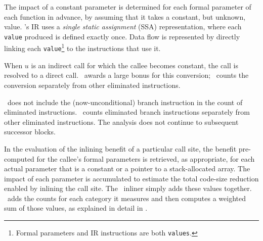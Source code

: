 The impact of a constant parameter is determined for each formal
parameter of each function in advance, by assuming that it takes a
constant, but unknown, value.  \llvm's IR uses a {\it single static
  assignment} (SSA) representation, where each {\tt value} produced is
defined exactly once.  Data flow is represented by directly linking
each {\tt value}\footnote{Formal parameters and IR instructions are
  both {\tt values}.}  to the instructions that use it.  

When $u$ is an indirect call for which the callee becomes constant,
the call is resolved to a direct call.  \llvm\ awards a large bonus
for this conversion; \FDI\ counts the conversion separately from other
eliminated instructions.

\llvm\ does not include
the (now-unconditional) branch instruction in the count of eliminated
instructions. \FDI\ counts eliminated branch instructions separately
from other eliminated instructions.  The analysis does not continue to
subsequent successor blocks.

In the evaluation of the inlining benefit of a particular call site,
the benefit pre-computed for the callee's formal parameters is
retrieved, as appropriate, for each actual parameter that is a constant
or a pointer to a stack-allocated array.  The impact of each parameter
is accumulated to estimate the total code-size reduction enabled by
inlining the call site.  The \llvm\ inliner simply adds these values
together.  \FDI\ adds the counts for each category it measures and
then computes a weighted sum of those values, as explained in detail in
\cite{BerubePhD}.

